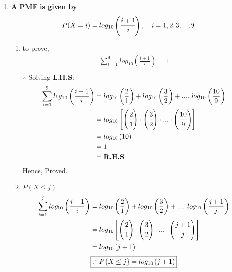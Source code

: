 \documentclass{article}
\begin{document}
\begin{enumerate}
\newpage
\item \textbf{A PMF is given by}\\
  \begin{align*}
    P(X={i}) = log_{10} \left(\cfrac{i + 1}{i}\right), \ \ \ i = 1, 2, 3,..., 9
  \end{align*}
  \begin{enumerate}
    \item to prove,
    \begin{align*}
      \sum_{i=1}^{9} log_{10}\left(\frac{i + 1}{i}\right) = 1\\
    \end{align*}
    $\therefore$ Solving \textbf{L.H.S}:
    \begin{align*}
      \sum_{i=1}^{9} log_{10}\left(\frac{i + 1}{i}\right) &= log_{10}\left(\frac{2}{1}\right) + log_{10}\left(\frac{3}{2}\right) + ....\ log_{10}\left(\frac{10}{9}\right)\\
      &= log_{10}\left[\left(\cfrac{2}{1}\right)\cdot\left(\cfrac{3}{2}\right)\cdot ...\cdot\left(\cfrac{10}{9}\right)\right]\\
      &= log_{10}\left(10\right)\\
      &= 1\\
      &= \textbf{R.H.S}
    \end{align*}
    Hence, Proved.\\
    \item $P(X \leq j) $
    \begin{align*}
      \sum_{i=1}^{j} log_{10}\left(\frac{i + 1}{i}\right) &= log_{10}\left(\frac{2}{1}\right) + log_{10}\left(\frac{3}{2}\right) + ....\ log_{10}\left(\frac{j + 1}{j}\right)\\
      &= log_{10}\left[\left(\cfrac{2}{1}\right)\cdot\left(\cfrac{3}{2}\right)\cdot ...\cdot\left(\cfrac{j + 1}{j}\right)\right]\\
      &= log_{10}\left(j + 1\right)\\
    \end{align*}
    \[
     \boxed{\therefore P\{X \leq j\} = log_{10}\left(j + 1\right)}\\
    \]
  \end{enumerate}
\end{enumerate}
\end{document}
